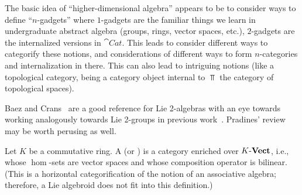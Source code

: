 
\begin{node}\label{hda-0000}%
The basic idea of ``higher-dimensional algebra'' appears to be to
consider ways to define ``$n$-gadgets'' where $1$-gadgets are the
familiar things we learn in undergraduate abstract algebra (groups,
rings, vector spaces, etc.), $2$-gadgets are the internalized versions
in $\cat{Cat}$. This leads to consider different ways to categorify
these notions, and considerations of different ways to form
$n$-categories and internalization in there. This can also lead to
intriguing notions (like a topological category, being a category object
internal to $\Top$ the category of topological spaces).
\end{node}

\begin{node}\label{hda-0001}%
Baez and Crans~\cite{baez2010higherdimensional} are a good reference for
Lie 2-algebras with an eye towards working analogously towards Lie
2-groups in previous work~\cite{baez2004higherdimensional}. Pradines'
review~\cite{pradines2007ehresmanns} may be worth perusing as well.
\end{node}

\begin{definition}\label{hda-0002}%
Let $K$ be a commutative ring.
A  (or ) is a category
enriched over $K\textrm{-}\mathbf{Vect}$, i.e., whose
$\hom$-sets are vector spaces and whose composition operator is bilinear.
(This is a horizontal categorification of the notion of an associative
algebra; therefore, a Lie algebroid does not fit into this definition.) 
\end{definition}

